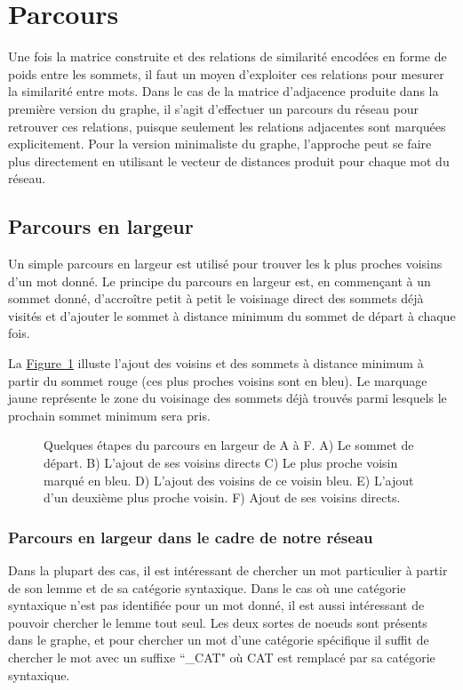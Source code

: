 \section{Parcours}

Une fois la matrice construite et des relations de similarité encodées en forme 
de poids entre les sommets, il faut un moyen d'exploiter ces relations pour 
mesurer la similarité entre mots. Dans le cas de la matrice d'adjacence produite 
dans la première version du graphe, il s'agit d'effectuer un parcours du réseau 
pour retrouver ces relations, puisque seulement les relations adjacentes sont 
marquées explicitement. Pour la version minimaliste du graphe, l'approche peut 
se faire plus directement en utilisant le vecteur de distances produit pour 
chaque mot du réseau.

\subsection{Parcours en largeur}

Un simple parcours en largeur est utilisé pour trouver les k plus proches voisins d'un mot donné. Le principe du parcours en largeur est, en commençant à un sommet donné, d'accroître petit à petit le voisinage direct des sommets déjà visités et d'ajouter le sommet à distance minimum du sommet de départ à chaque fois.

La \hyperref[fig:bfs]{Figure~\ref*{fig:bfs}} illuste l'ajout des voisins et des sommets à distance minimum à partir du sommet rouge (ces plus proches voisins sont en bleu). Le marquage jaune représente le zone du voisinage des sommets déjà trouvés parmi lesquels le prochain sommet minimum sera pris.

\begin{figure}[!ht]
\centering
\def\svgwidth{\columnwidth}

\caption{Quelques étapes du parcours en largeur de A à F. A) Le sommet de départ. B) L'ajout de ses voisins directs
C) Le plus proche voisin marqué en bleu. D) L'ajout des voisins de ce voisin bleu. E) L'ajout d'un deuxième plus proche voisin. F) Ajout de ses voisins directs.}
\label{fig:bfs}
\end{figure}

\subsubsection{Parcours en largeur dans le cadre de notre réseau}

Dans la plupart des cas, il est intéressant de chercher un mot particulier à partir de son lemme et de sa catégorie syntaxique. Dans le cas où une catégorie syntaxique n'est pas identifiée pour un mot donné, il est aussi intéressant de pouvoir chercher le lemme tout seul. Les deux sortes de noeuds sont présents dans le graphe, et pour chercher un mot d'une catégorie spécifique il suffit de chercher le mot avec un suffixe ``\_CAT" où CAT est remplacé par sa catégorie syntaxique.

